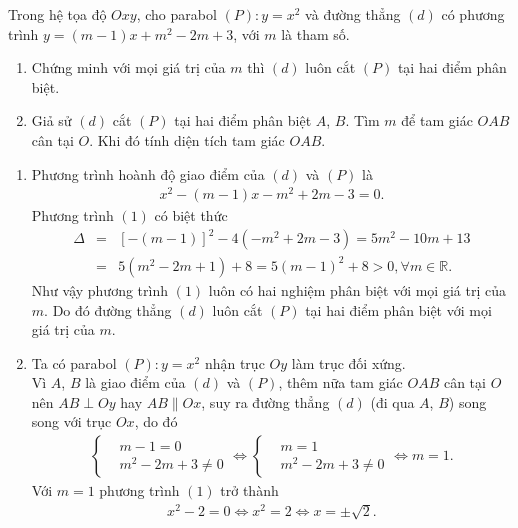 \begin{bt}%
	Trong hệ tọa độ $Oxy$, cho parabol $(P)\colon y=x^2$ và đường thẳng $(d)$ có phương trình $y=(m-1)x+m^2-2m+3$, với $m$ là tham số.
	\begin{enumerate}
		\item Chứng minh với mọi giá trị của $m$ thì $(d)$ luôn cắt $(P)$ tại hai điểm phân biệt.
		\item Giả sử $(d)$ cắt $(P)$ tại hai điểm phân biệt $A$, $B$. Tìm $m$ để tam giác $OAB$ cân tại $O$. Khi đó tính diện tích tam giác $OAB$.
	\end{enumerate}
	\loigiai
	{
		\begin{enumerate}
			\item Phương trình hoành độ giao điểm của $(d)$ và $(P)$ là
			\begin{align*}
			x^2-(m-1)x-m^2+2m-3=0. \tag{1}
			\end{align*}
			Phương trình $(1)$ có biệt thức
			\begin{eqnarray*}
				\Delta &=& [-(m-1)]^2-4(-m^2+2m-3) = 5m^2-10m+13 \\
				&=& 5(m^2-2m+1)+8=5(m-1)^2+8>0,\forall m \in \mathbb{R}.
			\end{eqnarray*}
			Như vậy phương trình $(1)$ luôn có hai nghiệm phân biệt với mọi giá trị của $m$. Do đó đường thẳng $(d)$ luôn cắt $(P)$ tại hai điểm phân biệt với mọi giá trị của $m$.
			\item Ta có parabol $(P)\colon y=x^2$ nhận trục $Oy$ làm trục đối xứng.\\
			Vì $A$, $B$ là giao điểm của $(d)$ và $(P)$, thêm nữa tam giác $OAB$ cân tại $O$ nên $AB \perp Oy$ hay $AB \parallel Ox$, suy ra đường thẳng $(d)$ (đi qua $A$, $B$) song song với trục $Ox$, do đó
			\begin{eqnarray*}
				\left\{\begin{aligned}&m-1=0 \\&m^2-2m+3 \neq 0\end{aligned}\right. \Leftrightarrow \left\{\begin{aligned}&m=1 \\&m^2-2m+3\neq 0\end{aligned}\right. \Leftrightarrow m=1.
			\end{eqnarray*}
			Với $m=1$ phương trình $(1)$ trở thành
			\begin{eqnarray*}
				x^2-2=0 \Leftrightarrow x^2=2 \Leftrightarrow x = \pm \sqrt{2}.
			\end{eqnarray*}

\end{enumerate}}
\end{bt}
